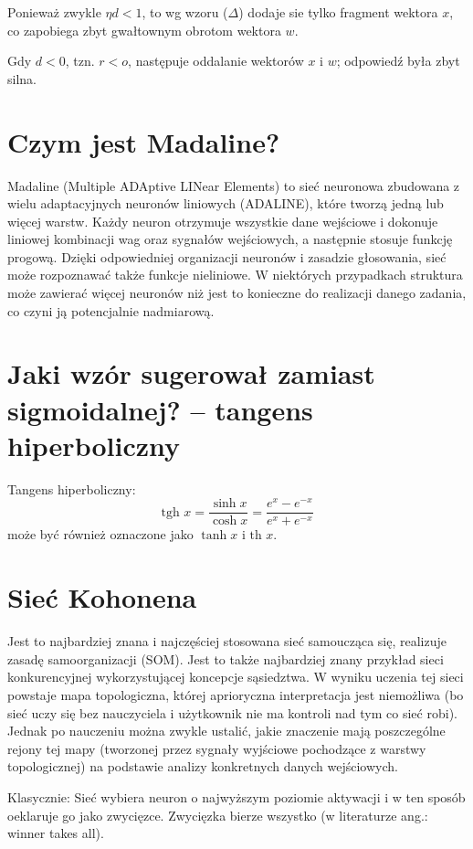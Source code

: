 \documentclass[a4paper,12pt]{article}
\begin{document}
Ponieważ zwykle $\eta d < 1$, to wg wzoru ($\Delta$) dodaje sie tylko fragment wektora $x$, co zapobiega
zbyt gwałtownym obrotom wektora $w$.

Gdy $d < 0$, tzn. $r < o$, następuje oddalanie wektorów $x$ i $w$; odpowiedź była zbyt silna.

\section{Czym jest Madaline?}
Madaline (Multiple ADAptive LINear Elements) to sieć neuronowa zbudowana z wielu adaptacyjnych neuronów liniowych (ADALINE), które tworzą jedną lub więcej warstw.
Każdy neuron otrzymuje wszystkie dane wejściowe i dokonuje liniowej kombinacji wag oraz sygnałów wejściowych, a następnie stosuje funkcję progową.
Dzięki odpowiedniej organizacji neuronów i zasadzie głosowania, sieć może rozpoznawać także funkcje nieliniowe.
W niektórych przypadkach struktura może zawierać więcej neuronów niż jest to konieczne do realizacji danego zadania, co czyni ją potencjalnie nadmiarową.

\section{Jaki wzór sugerował zamiast sigmoidalnej? – tangens hiperboliczny}
Tangens hiperboliczny:
\[
    \text{tgh }x = \frac{\sinh x}{\cosh x} = \frac{e^x - e^{-x}}{e^x + e^{-x}}
\]
może być również oznaczone jako $\tanh x$ i $\text{th }x$.

\section{Sieć Kohonena}
Jest to najbardziej znana i najczęściej stosowana sieć samoucząca się,
realizuje zasadę samoorganizacji (SOM). Jest to także najbardziej znany
przykład sieci konkurencyjnej wykorzystującej koncepcje sąsiedztwa. W
wyniku uczenia tej sieci powstaje mapa topologiczna, której aprioryczna
interpretacja jest niemożliwa (bo sieć uczy się bez nauczyciela i
użytkownik nie ma kontroli nad tym co sieć robi). Jednak po nauczeniu
można zwykle ustalić, jakie znaczenie mają poszczególne rejony tej mapy
(tworzonej przez sygnały wyjściowe pochodzące z warstwy
topologicznej) na podstawie analizy konkretnych danych wejściowych.

Klasycznie: Sieć wybiera neuron o najwyższym poziomie aktywacji i w ten sposób oeklaruje go jako zwycięzce.
Zwycięzka bierze wszystko (w literaturze ang.: winner takes all).
\end{document}
